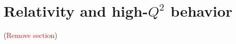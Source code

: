 \documentclass[twocolumn,prc,showpacs,nofootinbib,preprintnumbers,amsmath,amssymb,superscriptaddress]{revtex4-1}
\begin{document}



\section{Relativity and high-$Q^2$ behavior}
\label{Sec:Relativity-and-Q2behaviour}

(\textcolor{red}{Remove section})

\end{document}
